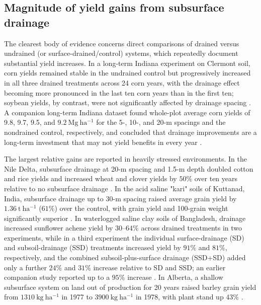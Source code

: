 \subsection{Magnitude of yield gains from subsurface drainage}

The clearest body of evidence concerns direct comparisons of drained versus undrained (or surface-drained/control) systems, which repeatedly document substantial yield increases. In a long-term Indiana experiment on Clermont soil, corn yields remained stable in the undrained control but progressively increased in all three drained treatments across 24 corn years, with the drainage effect becoming more pronounced in the last ten corn years than in the first ten; soybean yields, by contrast, were not significantly affected by drainage spacing \parencite{Rui2024}. A companion long-term Indiana dataset found whole-plot average corn yields of 9.8, 9.7, 9.5, and \(9.2\ \mathrm{Mg\ ha^{-1}}\) for the 5-, 10-, and 20-m spacings and the nondrained control, respectively, and concluded that drainage improvements are a long-term investment that may not yield benefits in every year \parencite{Kladivko2005}.

The largest relative gains are reported in heavily stressed environments. In the Nile Delta, subsurface drainage at 20-m spacing and 1.5-m depth doubled cotton and rice yields and increased wheat and clover yields by \(50\%\) over ten years relative to no subsurface drainage \parencite{ELMOWELHI1988}. In the acid saline "kari" soils of Kuttanad, India, subsurface drainage up to 30-m spacing raised average grain yield by \(1.36\ \mathrm{t\ ha^{-1}}\) (\(61\%\)) over the control, with grain yield and 100-grain weight significantly superior \parencite{Mathew2001}. In waterlogged saline clay soils of Bangladesh, drainage increased sunflower achene yield by \(30\textrm{--}64\%\) across drained treatments in two experiments, while in a third experiment the individual surface-drainage (SD) and subsoil-drainage (SSD) treatments increased yield by \(91\%\) and \(81\%\), respectively, and the combined subsoil-plus-surface drainage (SSD+SD) added only a further \(24\%\) and \(31\%\) increase relative to SD and SSD; an earlier companion study reported up to a \(95\%\) increase \parencite{Islam2025,Islam2022}. In Alberta, a shallow subsurface system on land out of production for 20 years raised barley grain yield from \(1310\ \mathrm{kg\ ha^{-1}}\) in 1977 to \(3900\ \mathrm{kg\ ha^{-1}}\) in 1978, with plant stand up \(43\%\) \parencite{BENNETT1982}.

